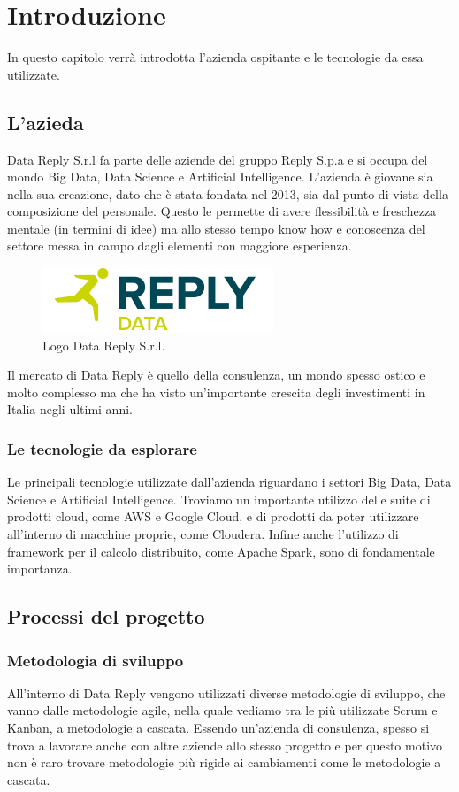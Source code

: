 \chapter{Introduzione}
\label{Introduzione}
In questo capitolo verrà introdotta l'azienda ospitante e le tecnologie da essa utilizzate.
\section{L'azieda}
Data Reply S.r.l fa parte delle aziende del gruppo Reply S.p.a e si occupa del mondo Big Data, Data Science e Artificial Intelligence. L'azienda è giovane sia nella sua creazione, dato che è stata fondata nel 2013, sia dal punto di vista della composizione del personale. Questo le permette di avere flessibilità e freschezza mentale (in termini di idee) ma allo stesso tempo know how e conoscenza del settore messa in campo dagli elementi con maggiore esperienza.

\begin{figure}
	\centering
	\includegraphics[scale=2]{figures/data-reply-logo}
	\caption[Logo Data Reply S.r.l.]{Logo Data Reply S.r.l.
		\label{fig:logoDataReply}}
\end{figure}

Il mercato di Data Reply è quello della consulenza, un mondo spesso ostico e molto complesso ma che ha visto un'importante crescita degli investimenti in Italia negli ultimi anni.
\subsection{Le tecnologie da esplorare}
Le principali tecnologie utilizzate dall'azienda riguardano i settori Big Data, Data Science e Artificial Intelligence. Troviamo un importante utilizzo delle suite di prodotti cloud, come \gls{AWS} e \gls{Google Cloud}, e di prodotti da poter utilizzare all'interno di macchine proprie, come \gls{Cloudera}. Infine anche l'utilizzo di framework per il calcolo distribuito, come \gls{Apache Spark}, sono di fondamentale importanza.
\section{Processi del progetto}
\subsection{Metodologia di sviluppo}
All'interno di Data Reply vengono utilizzati diverse metodologie di sviluppo, che vanno dalle metodologie agile, nella quale vediamo tra le più utilizzate \gls{Scrum} e \gls{Kanban}, a metodologie a cascata. Essendo un'azienda di consulenza, spesso si trova a lavorare anche con altre aziende allo stesso progetto e per questo motivo non è raro trovare metodologie più rigide ai cambiamenti come le metodologie a cascata.
